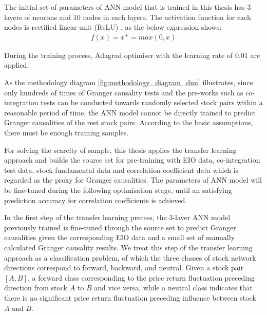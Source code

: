 The initial set of parameters of ANN model that is trained in this thesis has 3 layers of neurons and 10 nodes in each layers. The activation function for each nodes is rectified linear unit (ReLU) \cite{hahnloser2000digital}, as the below expression shows:
\begin{eqnarray}
f\left(x\right)=x^+=max\left(0,x\right)
\end{eqnarray}

During the training process, Adagrad optimiser \cite{duchi2011adaptive} with the learning rate of 0.01 are applied.

As the methodology diagram \ref{fig:methodology_diagram_dnn} illustrates, since only hundreds of times of Granger causality tests and the pre-works such as co-integration tests can be conducted towards randomly selected stock pairs within a reasonable period of time, the ANN model cannot be directly trained to predict Granger causalities of the rest stock pairs. According to the basic assumptions, there must be enough training samples.

For solving the scarcity of sample, this thesis applies the transfer learning approach and builds the source set for pre-training with EIO data, co-integration test data, stock fundamental data and correlation coefficient data which is regarded as the proxy for Granger causalities. The parameters of ANN model will be fine-tuned during the following optimisation stage, until an satisfying prediction accuracy for correlation coefficients is achieved.

In the first step of the transfer learning precess, the 3-layer ANN model previously trained is fine-tuned through the source set to predict Granger causalities given the corresponding EIO data and a small set of manually calculated Granger causality results. We treat this step of the transfer learning approach as a classification problem, of which the three classes of stock network directions correspond to forward, backward, and neutral. Given a stock pair $[A,B]$, a forward class corresponding to the price return fluctuation preceding direction from stock $A$ to $B$ and vice versa, while a neutral class indicates that there is no significant price return fluctuation preceding influence between stock $A$ and $B$.


